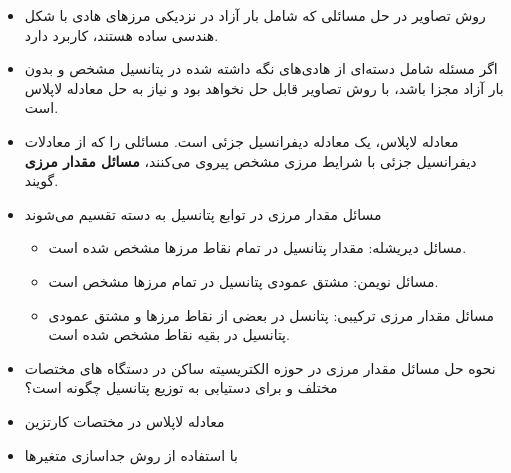 \ELhold


\begin{ELunit}


\begin{itemize}
\tightlist
\item
  روش تصاویر در حل مسائلی که شامل بار آزاد در نزدیکی مرزهای هادی با شکل هندسی ساده هستند، کاربرد دارد.
\item
  اگر مسئله شامل دسته‌ای از هادی‌های نگه داشته شده در پتانسیل مشخص و بدون بار آزاد مجزا باشد، با روش تصاویر قابل حل نخواهد بود و نیاز به حل معادله لاپلاس است.
\item
  معادله لاپلاس، یک معادله دیفرانسیل جزئی است. مسائلی را که از معادلات دیفرانسیل جزئی با شرایط مرزی مشخص پیروی می‌کنند، \textbf{مسائل مقدار مرزی} گویند.
\item
  مسائل مقدار مرزی در توابع پتانسیل به دسته تقسیم می‌شوند

  \begin{itemize}
  \tightlist
  \item
    مسائل دیریشله: مقدار پتانسیل در تمام نقاط مرزها مشخص شده است.
  \item
    مسائل نویمن: مشتق عمودی پتانسیل در تمام مرزها مشخص است.
  \item
    مسائل مقدار مرزی ترکیبی: پتانسل در بعضی از نقاط مرزها و مشتق عمودی پتانسیل در بقیه نقاط مشخص شده است.
  \end{itemize}
\item
  نحوه حل مسائل مقدار مرزی در حوزه الکتریسیته ساکن در دستگاه های مختصات مختلف و برای دستیابی به توزیع پتانسیل چگونه است؟
\end{itemize}

\end{ELunit}

\ELhold


\begin{ELunit}

\begin{itemize}
\tightlist
\item
  معادله لاپلاس در مختصات کارتزین
\end{itemize}


\begin{itemize}
\tightlist
\item
  با استفاده از روش جداسازی متغیرها
\end{itemize}


\end{ELunit}

